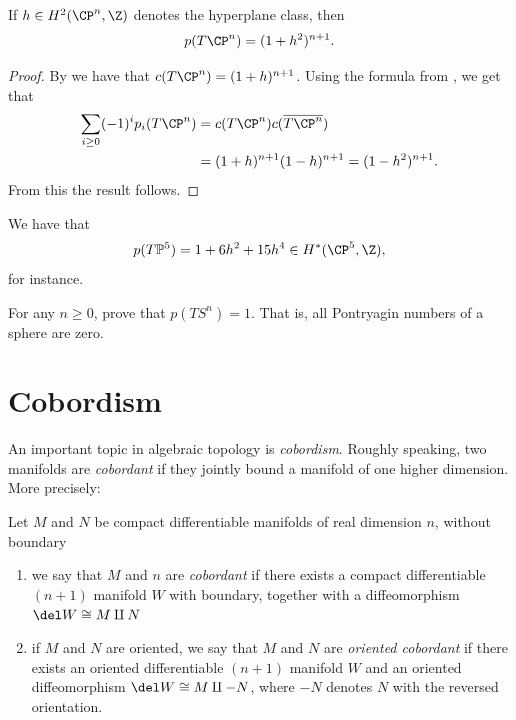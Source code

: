 \documentclass[11pt]{book}
\begin{document}
\begin{theorem}
\label{thm:pontryagin-numbers-cpn} 
If $h \in H^2(\CP^n,\Z)$ denotes the hyperplane class, then
\begin{align*}
    p(T\CP^n) = (1+h^2)^{n+1}.
\end{align*}
\end{theorem}
\begin{proof} By  we have that $c(T\CP^n) = (1+h)^{n+1}$. Using the formula from , we get that
\begin{align*}
    \sum_{i\ge0} (-1)^i p_i(T\CP^n) &= c(T \CP^n) c(\overline{T\CP^n}) \\
    &= (1+h)^{n+1}(1-h)^{n+1} = (1-h^2)^{n+1}.
\end{align*}
From this the result follows.
\end{proof}

\begin{example} We have that
\begin{align*}
    p(T \mathbb{P}^5) = 1 + 6h^2 + 15h^4 \in H^\ast(\CP^5,\Z),
\end{align*}
for instance.
\end{example}

\begin{exercise} For any $n\ge0$, prove that $p(TS^n)=1$. That is, all Pontryagin numbers of a sphere are zero.
\end{exercise}





\section{Cobordism}

An important topic in algebraic topology is \emph{cobordism}. Roughly speaking, two manifolds are \emph{cobordant} if they jointly bound a manifold of one higher dimension. More precisely:

\begin{definition}\label{def:cobordism} Let $M$ and $N$ be compact differentiable manifolds of real dimension $n$, without boundary
\begin{enumerate}
    \item we say that $M$ and $n$ are \emph{cobordant} if there exists a compact differentiable $(n+1)$ manifold $W$ with boundary, together with a diffeomorphism $\del W \cong M \amalg N$
    \item if $M$ and $N$ are oriented, we say that $M$ and $N$ are \emph{oriented cobordant} if there exists an oriented differentiable $(n+1)$ manifold $W$ and an oriented diffeomorphism $\del W \cong M \amalg -N$, where $-N$ denotes $N$ with the reversed orientation.
\end{enumerate}
\end{definition}
\end{document}
